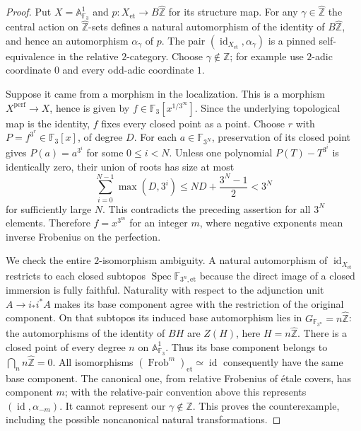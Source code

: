 \begin{proof}
Put $X=\mathbb A^1_{\mathbb F_3}$ and
$p:X_{\mathrm{et}}\to B\widehat{\mathbb Z}$ for its structure map.
For any $\gamma\in\widehat{\mathbb Z}$ the central action on
$\widehat{\mathbb Z}$-sets defines a natural automorphism of the
identity of $B\widehat{\mathbb Z}$, and hence an automorphism
$\alpha_\gamma$ of $p$. The pair
$(\operatorname{id}_{X_{\mathrm{et}}},\alpha_\gamma)$ is a pinned
self-equivalence in the relative $2$-category. Choose
$\gamma\notin\mathbb Z$; for example use $2$-adic coordinate $0$
and every odd-adic coordinate $1$.

Suppose it came from a morphism in the localization. This is a
morphism $X^{\mathrm{perf}}\to X$, hence is given by
$f\in\mathbb F_3[x^{1/3^\infty}]$. Since the underlying topological
map is the identity, $f$ fixes every closed point as a point. Choose
$r$ with $P=f^{3^r}\in\mathbb F_3[x]$, of degree $D$. For each
$a\in\mathbb F_{3^N}$, preservation of its closed point gives
$P(a)=a^{3^i}$ for some $0\leq i<N$. Unless one polynomial
$P(T)-T^{3^i}$ is identically zero, their union of roots has size at
most
\[
 \sum_{i=0}^{N-1}\max(D,3^i)
 \leq ND+\frac{3^N-1}{2}<3^N
\]
for sufficiently large $N$. This contradicts the preceding assertion
for all $3^N$ elements. Therefore $f=x^{3^m}$ for an integer $m$,
where negative exponents mean inverse Frobenius on the perfection.

We check the entire $2$-isomorphism ambiguity. A natural automorphism
of $\operatorname{id}_{X_{\mathrm{et}}}$ restricts to each closed
subtopos $\operatorname{Spec}\mathbb F_{3^n,\mathrm{et}}$ because
the direct image of a closed immersion is fully faithful. Naturality
with respect to the adjunction unit $A\to i_*i^*A$ makes its
base component agree with the restriction of the original component. On that
subtopos its induced base automorphism lies in
$G_{\mathbb F_{3^n}}=n\widehat{\mathbb Z}$: the automorphisms of
the identity of $BH$ are $Z(H)$, here $H=n\widehat{\mathbb Z}$.
There is a closed point of every degree $n$ on $\mathbb A^1_{\mathbb F_3}$.
Thus its base component belongs to
$\bigcap_n n\widehat{\mathbb Z}=0$. All isomorphisms
$(\operatorname{Frob}^m)_{\mathrm{et}}\simeq\operatorname{id}$
consequently have the same base component. The canonical one, from
relative Frobenius of \'etale covers, has component $m$; with the
relative-pair convention above this represents
$(\operatorname{id},\alpha_{-m})$. It cannot represent our
$\gamma\notin\mathbb Z$. This proves the counterexample, including
the possible noncanonical natural transformations.
\end{proof}

